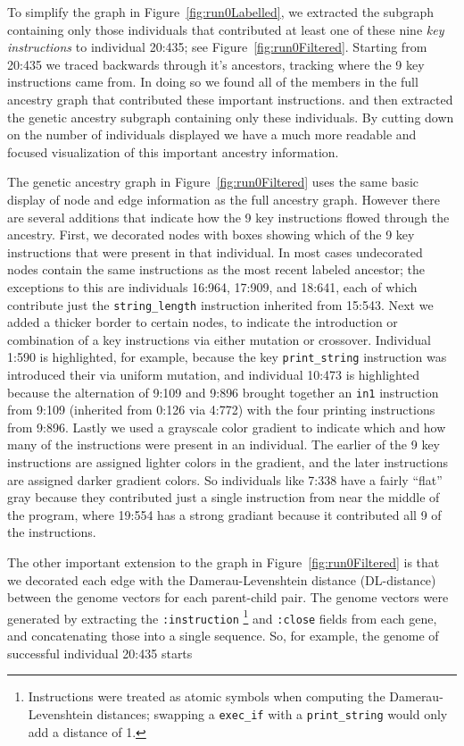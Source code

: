 \documentclass[graybox]{svmult}
\begin{document}
To simplify the graph in Figure~\ref{fig:run0Labelled}, we extracted the
subgraph containing only those individuals that contributed at least one
of these nine \emph{key instructions} to individual 20:435; see
Figure~\ref{fig:run0Filtered}.
Starting from 20:435 we traced backwards through it's 
ancestors, tracking where
the 9 key instructions came from. In doing so we found all of the members
in the full ancestry graph that contributed these important instructions. and then extracted the genetic
ancestry subgraph containing only these individuals. By cutting down on the 
number of individuals displayed
we have a much more readable and focused visualization of this important 
ancestry information.

The genetic ancestry graph in Figure~\ref{fig:run0Filtered} uses the same basic display of node and edge information
as the full ancestry graph.
However there are several additions that indicate how the 9 key instructions
flowed through the ancestry. 
First, we decorated nodes with boxes showing which of the 9 key instructions that were present in that individual. In most cases undecorated nodes
contain the same instructions as the most recent labeled ancestor; the
exceptions to this are individuals 16:964, 17:909, and 18:641, each of which 
contribute just the \texttt{string\_length} instruction inherited from 15:543. 
Next we added a thicker border to 
certain nodes, to indicate the introduction or combination of a key 
instructions via either mutation or crossover. Individual 1:590 is highlighted,
for example, because the key \texttt{print\_string} instruction was introduced 
their via uniform mutation, and individual 10:473 is highlighted because the
alternation of 9:109 and 9:896 brought together an \texttt{in1} instruction
from 9:109 (inherited from 0:126 via 4:772) with the four printing instructions 
from 9:896. Lastly
we used a grayscale color gradient to indicate which and how many of the 
instructions were present in an individual. The earlier of the 9 key 
instructions are assigned lighter colors in the gradient, and the later 
instructions are assigned darker gradient colors. So individuals like 7:338 
have a fairly ``flat'' gray because they contributed just a single
instruction from near the middle of the program, where 19:554 has a strong
gradiant because it contributed all 9 of the instructions.

The other important extension to the graph in Figure~\ref{fig:run0Filtered} 
is that we decorated each edge with the Damerau-Levenshtein distance (DL-distance)
between the genome vectors for each parent-child pair. The genome
vectors were generated by extracting the \texttt{:instruction}
\footnote{Instructions were treated as atomic symbols when computing the
	Damerau-Levenshtein distances; swapping a \texttt{exec\_if} with a \texttt{print\_string} would only add a
	distance of 1.}
and 
\texttt{:close} fields from each gene, and concatenating those into a
single sequence. So, for example, the genome of successful individual
20:435 starts
\end{document}
